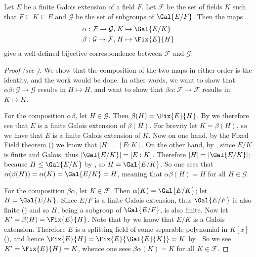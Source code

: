 \begin{theorem}\label{thrm-fundamental-theorem-of-galois-theory}
    Let $E$ be a finite Galois extension of a field $F$. Let $\mathcal{F}$ be the set of fields $K$ such that $F \subseteq K \subseteq E$ and $\mathcal{G}$ be the set of subgroups of $\Gal{E/F}$. Then the maps
    \begin{align*}
        \alpha: \mathcal{F} \to \mathcal{G}, \;&K \mapsto \Gal{E/K}\\
        \beta: \mathcal{G} \to \mathcal{F}, \;&H \mapsto \Fix{E}{H}
    \end{align*}
    give a well-defined bijective correspondence between $\mathcal{F}$ and $\mathcal{G}$.
\end{theorem}
\begin{proof}[Proof (see {\cite[Theorem 16.7.1]{artin_2011}})]
    We show that the composition of the two maps in either order is the identity, and the work would be done. In other words, we want to show that $\alpha\beta: \mathcal{G} \to \mathcal{G}$ results in $H \mapsto H$, and want to show that $\beta\alpha: \mathcal{F} \to \mathcal{F}$ results in $K \mapsto K$.

    For the composition $\alpha\beta$, let $H \in \mathcal{G}$. Then $\beta(H) = \Fix{E}{H}$. By  we therefore see that $E$ is a finite Galois extension of $\beta(H)$. For brevity let $K = \beta(H)$, so we have that $E$ is a finite Galois extension of $K$. Now on one hand, by the Fixed Field theorem () we know that $|H| = [E:K]$. On the other hand, by , since $E/K$ is finite and Galois, thus $|\Gal{E/K}| = [E:K]$. Therefore $|H| = |\Gal{E/K}|$; because $H \leq \Gal{E/K}$ by , so $H = \Gal{E/K}$. So one sees that $\alpha(\beta(H)) = \alpha(K) = \Gal{E/K} = H$, meaning that $\alpha\beta(H) = H$ for all $H \in \mathcal{G}$.

    For the composition $\beta\alpha$, let $K \in \mathcal{F}$. Then $\alpha(K) = \Gal{E/K}$; let $H = \Gal{E/K}$. Since $E/F$ is a finite Galois extension, thus $\Gal{E/F}$ is also finite () and so $H$, being a subgroup of $\Gal{E/F}$, is also finite. Now let $K' = \beta(H) = \Fix{E}{H}$. Note that by  we know that $E/K$ is a Galois extension. Therefore $E$ is a splitting field of some separable polynomial in $K[x]$ (), and hence $\Fix{E}{H} = \Fix{E}{\Gal{E}{K}} = K$ by . So we see $K' = \Fix{E}{H} = K$, whence one sees $\beta\alpha(K) = K$ for all $K \in \mathcal{F}$.
\end{proof}

